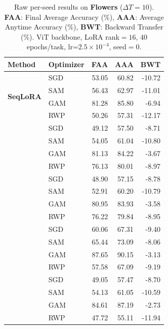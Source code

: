 
\begin{table}[ht]
\centering
\caption{%
  Raw per-seed results on \textbf{Flowers} ($\Delta T=10$).
  \textbf{FAA}: Final Average Accuracy (\%), \textbf{AAA}: Average Anytime Accuracy (\%),
  \textbf{BWT}: Backward Transfer (\%).
  ViT backbone, LoRA rank$=16$, 40 epochs/task, lr=$2.5\times10^{-4}$, seed$=0$.
}
\label{tab:raw_flowers}
\setlength{\tabcolsep}{4pt}
\renewcommand{\arraystretch}{0.92}
\small
\begin{tabular}{@{}l l r r r@{}}
\toprule
\textbf{Method} & \textbf{Optimizer} & \textbf{FAA} & \textbf{AAA} & \textbf{BWT} \\
\midrule
\multirow{4}{*}{\textbf{SeqLoRA}} & SGD & 53.05 & 60.82 & -10.72 \\
 & SAM & 56.43 & 62.97 & -11.01 \\
 & GAM & 81.28 & 85.80 & -6.94 \\
 & RWP & 50.26 & 57.31 & -12.17 \\
\addlinespace[3pt]
\multirow{4}{*}{\textbf{IncLoRA}} & SGD & 49.12 & 57.50 & -8.71 \\
 & SAM & 54.05 & 61.04 & -10.80 \\
 & GAM & 81.13 & 84.22 & -3.67 \\
 & RWP & 76.13 & 80.01 & -8.97 \\
\addlinespace[3pt]
\multirow{4}{*}{\textbf{OLoRA}} & SGD & 48.90 & 57.15 & -8.78 \\
 & SAM & 52.91 & 60.20 & -10.79 \\
 & GAM & 80.95 & 83.93 & -3.58 \\
 & RWP & 76.22 & 79.84 & -8.95 \\
\addlinespace[3pt]
\multirow{4}{*}{\textbf{InfLoRA}} & SGD & 60.06 & 67.31 & -9.40 \\
 & SAM & 65.44 & 73.09 & -8.06 \\
 & GAM & 87.65 & 90.15 & -3.13 \\
 & RWP & 57.58 & 67.09 & -9.19 \\
\addlinespace[3pt]
\multirow{4}{*}{\textbf{SDLoRA}} & SGD & 49.05 & 57.47 & -8.70 \\
 & SAM & 54.13 & 61.05 & -10.59 \\
 & GAM & 84.61 & 87.19 & -2.73 \\
 & RWP & 47.72 & 55.11 & -11.94 \\
\bottomrule
\end{tabular}
\end{table}

